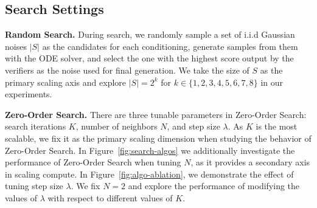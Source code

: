 \documentclass[11pt, letterpaper, logo]{googledeepmind}
\begin{document}
\begin{table}[h]
    \centering
    \caption{\footnotesize{\textbf{\emph{Default sampling settings for Class-conditioned and Text-conditioned generation.}} $\dagger$ In Figure~\ref{fig:scale-nfe} we report numbers with different NFEs/iter; $\ddagger$ In Figure~\ref{fig:search-classifier} we report results with different guidance scales.}}
    \label{tab:sample-setting}
    \vspace{-0.5cm}
\end{table}


\subsection{Search Settings}

\textbf{Random Search.} During search, we randomly sample a set of i.i.d Gaussian noises $|S|$ as the candidates for each conditioning, generate samples from them with the ODE solver, and select the one with the highest score output by the verifiers as the noise used for final generation. We take the size of $S$ as the primary scaling axis and explore $|S| = 2^k$ for $k \in \{1,2,3,4,5,6,7,8\}$ in our experiments.

\textbf{Zero-Order Search.} There are three tunable parameters in Zero-Order Search: search iterations $K$, number of neighbors $N$, and step size $\lambda$. As $K$ is the most scalable, we fix it as the primary scaling dimension when studying the behavior of Zero-Order Search. In Figure~\ref{fig:search-algos} we additionally investigate the performance of Zero-Order Search when tuning $N$, as it provides a secondary axis in scaling compute. In Figure~\ref{fig:algo-ablation}, we demonstrate the effect of tuning step size $\lambda$. We fix $N = 2$ and explore the performance of modifying the values of $\lambda$ with respect to different values of $K$.
\end{document}

